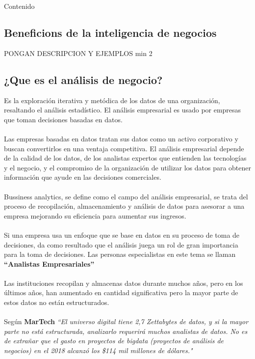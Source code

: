 \documentclass[twoside,twocolumn]{article}
\begin{document}
Contenido
 
\subsection{Beneficions de la inteligencia de negocios}

PONGAN DESCRIPCION Y EJEMPLOS min 2

\subsection{¿Que es el análisis de negocio?}

Es la exploración iterativa y metódica de los datos de una organización, resaltando el análisis estadístico. El análisis empresarial es usado por empresas que toman decisiones basadas en datos. 
\\ \\
Las empresas basadas en datos tratan sus datos como un activo corporativo y buscan convertirlos en una ventaja competitiva. El análisis empresarial depende de la calidad de los datos, de los analistas expertos que entienden las tecnologías y el negocio, y el compromiso de la organización de utilizar los datos para obtener información que ayude en las decisiones comerciales.
\\ \\
Bussiness analytics, se define como el campo del análisis empresarial, se trata del proceso de recopilación, almacenamiento y análisis de datos para asesorar a una empresa mejorando su eficiencia para aumentar sus ingresos.
\\ \\
Si una empresa usa un enfoque que se base en datos en su proceso de toma de decisiones, da como resultado que el análisis juega un rol de gran importancia para la toma de decisiones.  Las personas especialistas en este tema se llaman \textbf{ “Analistas Empresariales”}
\\ \\
Las instituciones recopilan y almacenas datos durante muchos años, pero en los últimos años, han aumentado en cantidad significativa pero la mayor parte de estos datos no están estructurados.  
\\ \\
Según \textbf{MarTech}
\textsl{“El universo digital tiene 2,7 Zettabytes de datos, y si la mayor parte no está estructurada, analizarlo requerirá muchos analistas de datos.  No es de extrañar que el gasto en proyectos de bigdata (proyectos de análisis de negocios) en el 2018 alcanzó los \$114 mil millones de dólares."}
\end{document}
